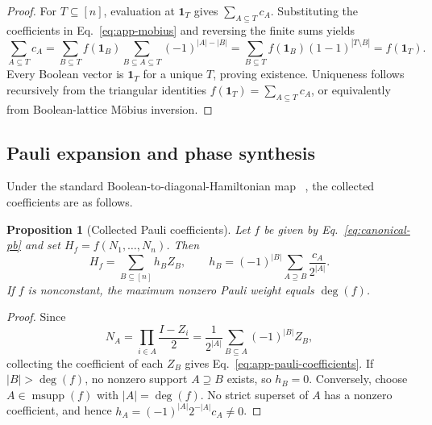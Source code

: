 \documentclass[a4paper,onecolumn,11pt,unpublished]{quantumarticle}
\newtheorem{proposition}[proposition]{Proposition}
\theoremstyle{remark}
\begin{document}
\begin{proof}
For \(T\subseteq[n]\), evaluation at \(\mathbf{1}_T\) gives
\(\sum_{A\subseteq T}c_A\).  Substituting the coefficients in
Eq.~\eqref{eq:app-mobius} and reversing the finite sums yields
\begin{equation*}
  \sum_{A\subseteq T}c_A
  =\sum_{B\subseteq T}f(\mathbf{1}_B)
    \sum_{B\subseteq A\subseteq T}(-1)^{|A|-|B|} 
  =\sum_{B\subseteq T}f(\mathbf{1}_B)(1-1)^{|T\setminus B|}
   =f(\mathbf{1}_T).
\end{equation*}
Every Boolean vector is \(\mathbf{1}_T\) for a unique \(T\), proving
existence.  Uniqueness follows recursively from the triangular identities
\(f(\mathbf{1}_T)=\sum_{A\subseteq T}c_A\), or equivalently from Boolean-lattice
M\"obius inversion.
\end{proof}

\subsection{Pauli expansion and phase synthesis}
\label{app:pauli-expansion}

Under the standard Boolean-to-diagonal-Hamiltonian map
~\cite{Hadfield2021}, the collected coefficients are as follows.
\begin{proposition}[Collected Pauli coefficients]
Let \(f\) be given by Eq.~\eqref{eq:canonical-pb} and set
\(H_f=f(N_1,\ldots,N_n)\).  Then
\begin{equation}
  H_f=\sum_{B\subseteq[n]}h_BZ_B,
  \qquad
  h_B=(-1)^{|B|}\sum_{A\supseteq B}\frac{c_A}{2^{|A|}}.
  \label{eq:app-pauli-coefficients}
\end{equation}
If \(f\) is nonconstant, the maximum nonzero Pauli weight equals \(\deg(f)\).
\end{proposition}

\begin{proof}
Since
\begin{equation}
  N_A=\prod_{i\in A}\frac{I-Z_i}{2}
     =\frac{1}{2^{|A|}}
      \sum_{B\subseteq A}(-1)^{|B|}Z_B,
  \label{eq:app-projector-pauli}
\end{equation}
collecting the coefficient of each \(Z_B\) gives
Eq.~\eqref{eq:app-pauli-coefficients}.  If \(|B|>\deg(f)\), no nonzero support
\(A\supseteq B\) exists, so \(h_B=0\).  Conversely, choose
\(A\in\operatorname{msupp}(f)\) with \(|A|=\deg(f)\).  No strict superset of
\(A\) has a nonzero coefficient, and hence
\(h_A=(-1)^{|A|}2^{-|A|}c_A\neq0\).
\end{proof}
\end{document}
